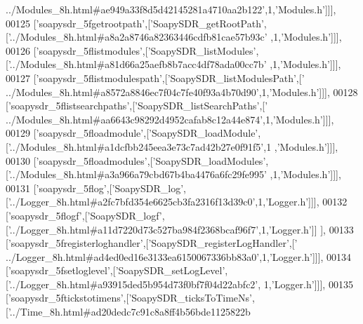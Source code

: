 \begin{DoxyCode}
{      ../Modules\_8h.html#ae949a33f8d5d42145281a4710aa2b122'},1,\textcolor{stringliteral}{'Modules.h'}]]],
00125   [\textcolor{stringliteral}{'soapysdr\_5fgetrootpath'},[\textcolor{stringliteral}{'SoapySDR\_getRootPath'},[\textcolor{stringliteral}{'../Modules\_8h.html#a8a2a8746a82363446cdfb81cae57b93c'}
      ,1,\textcolor{stringliteral}{'Modules.h'}]]],
00126   [\textcolor{stringliteral}{'soapysdr\_5flistmodules'},[\textcolor{stringliteral}{'SoapySDR\_listModules'},[\textcolor{stringliteral}{'../Modules\_8h.html#a81d66a25aefb8b7acc4df78ada00cc7b'}
      ,1,\textcolor{stringliteral}{'Modules.h'}]]],
00127   [\textcolor{stringliteral}{'soapysdr\_5flistmodulespath'},[\textcolor{stringliteral}{'SoapySDR\_listModulesPath'},[\textcolor{stringliteral}{'
      ../Modules\_8h.html#a8572a8846ec7f04c7fe40f93a4b70d90'},1,\textcolor{stringliteral}{'Modules.h'}]]],
00128   [\textcolor{stringliteral}{'soapysdr\_5flistsearchpaths'},[\textcolor{stringliteral}{'SoapySDR\_listSearchPaths'},[\textcolor{stringliteral}{'
      ../Modules\_8h.html#aa6643c98292d4952cafab8c12a44e874'},1,\textcolor{stringliteral}{'Modules.h'}]]],
00129   [\textcolor{stringliteral}{'soapysdr\_5floadmodule'},[\textcolor{stringliteral}{'SoapySDR\_loadModule'},[\textcolor{stringliteral}{'../Modules\_8h.html#a1dcfbb245eea3e73c7ad42b27e0f91f5'},1
      ,\textcolor{stringliteral}{'Modules.h'}]]],
00130   [\textcolor{stringliteral}{'soapysdr\_5floadmodules'},[\textcolor{stringliteral}{'SoapySDR\_loadModules'},[\textcolor{stringliteral}{'../Modules\_8h.html#a3a966a79cbd67b4ba4476a6fc29fe995'}
      ,1,\textcolor{stringliteral}{'Modules.h'}]]],
00131   [\textcolor{stringliteral}{'soapysdr\_5flog'},[\textcolor{stringliteral}{'SoapySDR\_log'},[\textcolor{stringliteral}{'../Logger\_8h.html#a2fc7bfd354e6625cb3fa2316f13d39c0'},1,\textcolor{stringliteral}{'Logger.h'}]]],
00132   [\textcolor{stringliteral}{'soapysdr\_5flogf'},[\textcolor{stringliteral}{'SoapySDR\_logf'},[\textcolor{stringliteral}{'../Logger\_8h.html#a11d7220d73c527ba984f2368bcaf96f7'},1,\textcolor{stringliteral}{'Logger.h'}]]
      ],
00133   [\textcolor{stringliteral}{'soapysdr\_5fregisterloghandler'},[\textcolor{stringliteral}{'SoapySDR\_registerLogHandler'},[\textcolor{stringliteral}{'
      ../Logger\_8h.html#ad4ed0ed16e3133ea6150067336bb83a0'},1,\textcolor{stringliteral}{'Logger.h'}]]],
00134   [\textcolor{stringliteral}{'soapysdr\_5fsetloglevel'},[\textcolor{stringliteral}{'SoapySDR\_setLogLevel'},[\textcolor{stringliteral}{'../Logger\_8h.html#a93915ded5b954d73f0bf7f04d22abfc2'},
      1,\textcolor{stringliteral}{'Logger.h'}]]],
00135   [\textcolor{stringliteral}{'soapysdr\_5ftickstotimens'},[\textcolor{stringliteral}{'SoapySDR\_ticksToTimeNs'},[\textcolor{stringliteral}{'../Time\_8h.html#ad20dedc7c91c8a8ff4b56bde1125822b
}
\end{DoxyCode}
